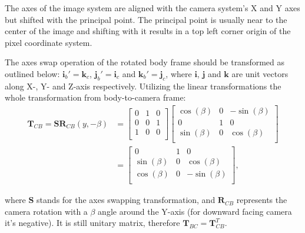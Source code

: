 The axes of the image system are aligned with the camera system's X and Y axes but shifted with the principal point. The principal point is usually near to the center of the image and shifting with it results in a top left corner origin of the pixel coordinate system.

The axes swap operation of the rotated body frame should be transformed as outlined below: $\mathbf{i}_b'=\mathbf{k}_c$, $\mathbf{j}_b'=\mathbf{i}_c$ and $\mathbf{k}_b'=\mathbf{j}_c$, where $\mathbf{i}$, $\mathbf{j}$ and $\mathbf{k}$ are unit vectors along X-, Y- and Z-axis respectively. Utilizing the linear transformations the whole transformation from body-to-camera frame:
\begin{equation}
\begin{aligned}
    \mathbf{T}_{CB}=\mathbf{S}\mathbf{R}_{CB}(y,-\beta) &= \begin{bmatrix}
            0 & 1 & 0 \\
            0 & 0 & 1 \\
            1 & 0 & 0 \\
        \end{bmatrix}
        \begin{bmatrix}
            \cos(\beta) & 0 & -\sin(\beta) \\
            0 & 1 & 0 \\
            \sin(\beta) & 0 & \cos(\beta) \\
        \end{bmatrix} \\ &= \begin{bmatrix}
            0 & 1 & 0 \\
            \sin(\beta) & 0 & \cos(\beta) \\
            \cos(\beta) & 0 & -\sin(\beta) \\
        \end{bmatrix},
\end{aligned}
\end{equation}

where $\mathbf{S}$ stands for the axes swapping transformation, and $\mathbf{R}_{CB}$ represents the camera rotation with a $\beta$ angle around the Y-axis (for downward facing camera it's negative). It is still unitary matrix, therefore $\mathbf{T}_{BC}=\mathbf{T}_{CB}^T$.


